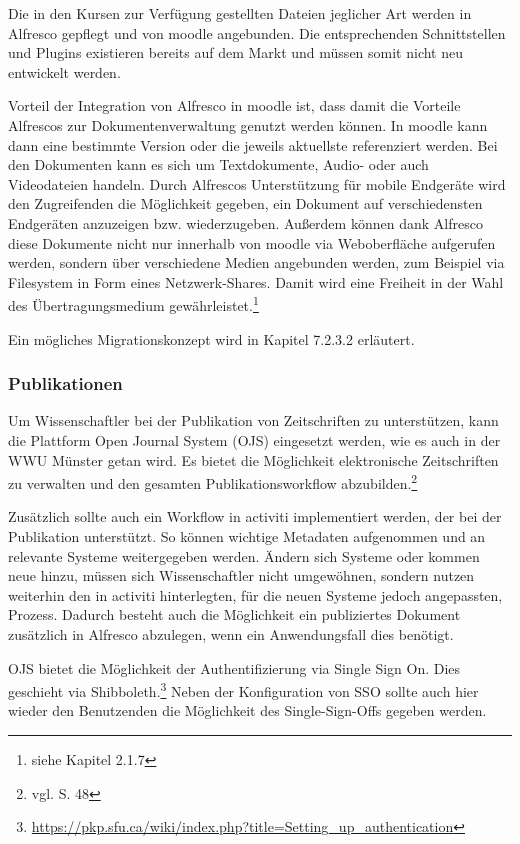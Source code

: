 Die in den Kursen zur Verfügung gestellten Dateien jeglicher Art werden in Alfresco gepflegt und von moodle angebunden. Die entsprechenden Schnittstellen und Plugins existieren bereits auf dem Markt und müssen somit nicht neu entwickelt werden.

Vorteil der Integration von Alfresco in moodle ist, dass damit die Vorteile Alfrescos zur Dokumentenverwaltung genutzt werden können. In moodle kann dann eine bestimmte Version oder die jeweils aktuellste referenziert werden. Bei den Dokumenten kann es sich um Textdokumente, Audio- oder auch Videodateien handeln. Durch Alfrescos Unterstützung für mobile Endgeräte wird den Zugreifenden die Möglichkeit gegeben, ein Dokument auf verschiedensten Endgeräten anzuzeigen bzw. wiederzugeben. Außerdem können dank Alfresco diese Dokumente nicht nur innerhalb von moodle via Weboberfläche aufgerufen werden, sondern über verschiedene Medien angebunden werden, zum Beispiel via Filesystem in Form eines Netzwerk-Shares. Damit wird eine Freiheit in der Wahl des Übertragungsmedium gewährleistet.\footnote{siehe Kapitel 2.1.7}

Ein mögliches Migrationskonzept wird in Kapitel 7.2.3.2 erläutert.

\subsubsection{Publikationen}
Um Wissenschaftler bei der Publikation von Zeitschriften zu unterstützen, kann die Plattform Open Journal System (OJS) eingesetzt werden, wie es auch in der WWU Münster getan wird. Es bietet die Möglichkeit elektronische Zeitschriften zu verwalten und den gesamten Publikationsworkflow abzubilden.\footnote{vgl. \cite{vogl_fortschritte_2012} S. 48}

Zusätzlich sollte auch ein Workflow in activiti implementiert werden, der bei der Publikation unterstützt. So können wichtige Metadaten aufgenommen und an relevante Systeme weitergegeben werden. Ändern sich Systeme oder kommen neue hinzu, müssen sich Wissenschaftler nicht umgewöhnen, sondern nutzen weiterhin den in activiti hinterlegten, für die neuen Systeme jedoch angepassten, Prozess. Dadurch besteht auch die Möglichkeit ein publiziertes Dokument zusätzlich in Alfresco abzulegen, wenn ein Anwendungsfall dies benötigt.

OJS bietet die Möglichkeit der Authentifizierung via Single Sign On. Dies geschieht via Shibboleth.\footnote{\url{https://pkp.sfu.ca/wiki/index.php?title=Setting_up_authentication}} Neben der Konfiguration von SSO sollte auch hier wieder den Benutzenden die Möglichkeit des Single-Sign-Offs gegeben werden.

